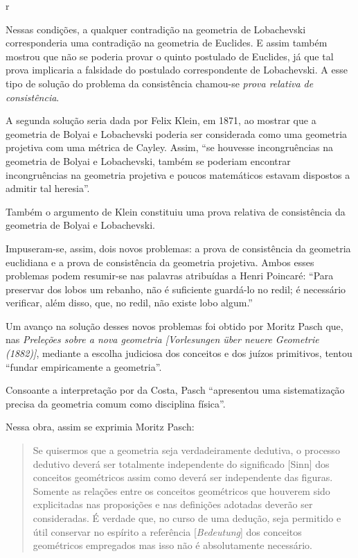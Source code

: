 r\documentclass{hipatia}
\begin{document}
Nessas condições, a qualquer contradição na geometria de Lobachevski corresponderia uma contradição na geometria de Euclides. E assim também mostrou que não se poderia provar o quinto postulado de Euclides, já que tal prova implicaria a falsidade do postulado correspondente de Lobachevski. A esse tipo de solução do problema da consistência chamou-se \emph{prova relativa de consistência}.  \cite[p. 388]{kneale}\cite[p. 325]{fraenkel1963}

A segunda solução seria dada por Felix Klein, em 1871, ao  mostrar que a geometria de Bolyai e Lobachevski poderia ser considerada como uma geometria projetiva com uma métrica de Cayley. Assim, ``se houvesse incongruências na geometria de Bolyai e Lobachevski, também se poderiam encontrar incongruências na geometria projetiva e poucos matemáticos estavam dispostos a admitir tal heresia''. \cite[p. 178]{struik1987}  

Também o argumento de Klein constituiu uma prova relativa de consistência da geometria de Bolyai e Lobachevski.

Impuseram-se, assim, dois novos problemas: a prova de consistência da geometria euclidiana e a prova de consistência da geometria projetiva. Ambos esses problemas podem resumir-se nas palavras atribuídas a Henri Poincaré: ``Para preservar dos lobos um rebanho, não é suficiente guardá-lo no redil; é necessário verificar, além disso, que, no redil, não existe lobo algum.''  \cite[p. 59]{babini1974}

Um avanço na solução desses novos problemas foi obtido por Moritz Pasch que, nas \emph{Preleções sobre a nova geometria [Vorlesungen über neuere Geometrie (1882)]}, mediante a escolha judiciosa dos conceitos e dos juízos primitivos, tentou ``fundar empiricamente a geometria''. \cite[p. 151]{pasch1924} 

Consoante a interpretação por da Costa, Pasch ``apresentou uma sistematização precisa da geometria comum como disciplina física''.  \cite[p. 193]{costa1994}

Nessa obra, assim se exprimia Moritz Pasch: 
\begin{quote}   
Se quisermos que a geometria seja verdadeiramente dedutiva, o processo dedutivo deverá ser totalmente independente do significado [Sinn] dos conceitos geométricos assim como deverá ser independente das figuras. Somente as relações entre os conceitos geométricos que houverem sido explicitadas nas proposições e nas definições adotadas deverão ser consideradas. É verdade que, no curso de uma dedução, seja permitido e útil conservar no espírito a referência [\emph{Bedeutung}] dos conceitos geométricos empregados mas isso não é absolutamente necessário.  
\cite[\emph{apud}, p. 283]{bottazzini2001}\cite[\emph{apud}, p. 654]{gandon2005}
\end{quote}
\end{document}
